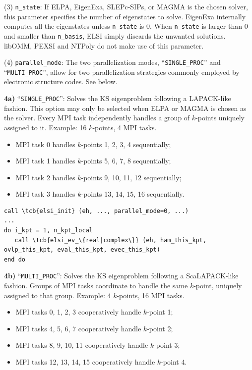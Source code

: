 \documentclass{report}
\newcommand{\tcb}[1]{\textcolor{blue}{#1}}
\begin{document}
(3) \texttt{n\_state}: If ELPA, EigenExa, SLEPc-SIPs, or MAGMA is the chosen solver, this parameter specifies the number of eigenstates to solve. EigenExa internally computes all the eigenstates unless \texttt{n\_state} is 0. When \texttt{n\_state} is larger than 0 and smaller than \texttt{n\_basis}, ELSI simply discards the unwanted solutions. libOMM, PEXSI and NTPoly do not make use of this parameter.

(4) \texttt{parallel\_mode}: The two parallelization modes, ``\texttt{SINGLE\_PROC}'' and ``\texttt{MULTI\_PROC}'', allow for two parallelization strategies commonly employed by electronic structure codes. See below.

\textbf{4a)} ``\texttt{SINGLE\_PROC}'': Solves the KS eigenproblem following a LAPACK-like fashion. This option may only be selected when ELPA or MAGMA is chosen as the solver. Every MPI task independently handles a group of $k$-points uniquely assigned to it. Example: 16 $k$-points, 4 MPI tasks.
\begin{itemize}
\item MPI task 0 handles $k$-points 1, 2, 3, 4 sequentially;
\item MPI task 1 handles $k$-points 5, 6, 7, 8 sequentially;
\item MPI task 2 handles $k$-points 9, 10, 11, 12 sequentially;
\item MPI task 3 handles $k$-points 13, 14, 15, 16 sequentially.
\end{itemize}

\begin{tcolorbox}
\begin{Verbatim}[commandchars=\\\{\}]
call \tcb{elsi_init} (eh, ..., parallel_mode=0, ...)
...
do i_kpt = 1, n_kpt_local
   call \tcb{elsi_ev_\{real|complex\}} (eh, ham_this_kpt, ovlp_this_kpt, eval_this_kpt, evec_this_kpt)
end do
\end{Verbatim}
\end{tcolorbox}

\textbf{4b)} ``\texttt{MULTI\_PROC}'': Solves the KS eigenproblem following a ScaLAPACK-like fashion. Groups of MPI tasks coordinate to handle the same $k$-point, uniquely assigned to that group. Example: 4 $k$-points, 16 MPI tasks.
\begin{itemize}
\item MPI tasks 0, 1, 2, 3 cooperatively handle $k$-point 1;
\item MPI tasks 4, 5, 6, 7 cooperatively handle $k$-point 2;
\item MPI tasks 8, 9, 10, 11 cooperatively handle $k$-point 3;
\item MPI tasks 12, 13, 14, 15 cooperatively handle $k$-point 4.
\end{itemize}
\end{document}
